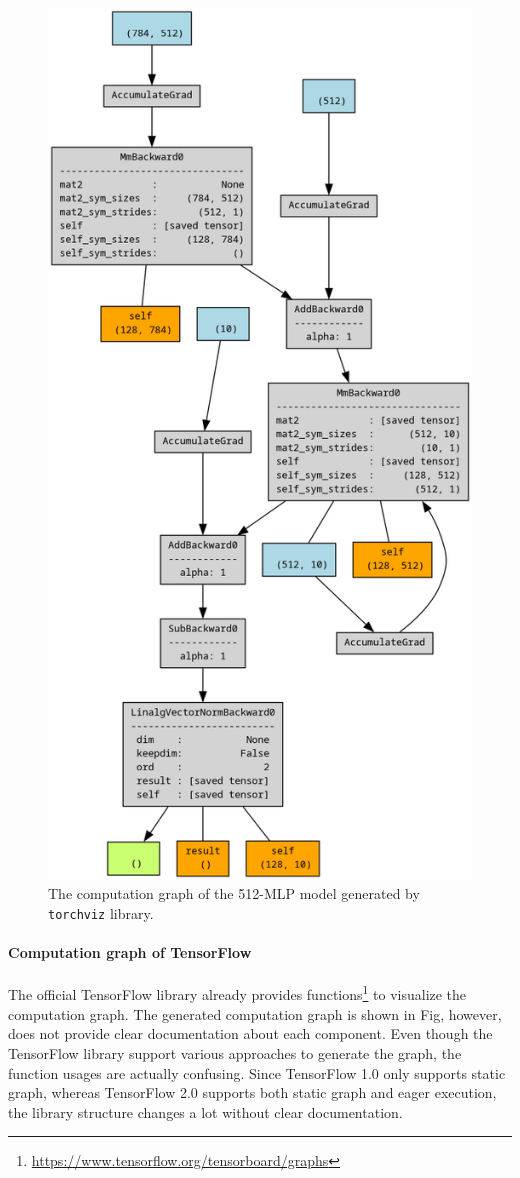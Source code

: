 \documentclass[12pt,twocolumn,letterpaper]{extarticle}
\begin{document}
\begin{figure}[ht]
    \centering
    \includegraphics[width=0.8\columnwidth]{images/pt-computation-graph.png}
    \caption{The computation graph of the 512-MLP model generated by \texttt{torchviz} library.}
    \label{fig:pt-computation-graph}
\end{figure}

\paragraph{Computation graph of TensorFlow}

The official TensorFlow library already provides functions\footnote{\url{https://www.tensorflow.org/tensorboard/graphs}} to visualize the computation graph. The generated computation graph is shown in Fig, however, does not provide clear documentation about each component. Even though the TensorFlow library support various approaches to generate the graph, the function usages are actually confusing. Since TensorFlow 1.0 only supports static graph, whereas TensorFlow 2.0 supports both static graph and eager execution, the library structure changes a lot without clear documentation.
\end{document}
